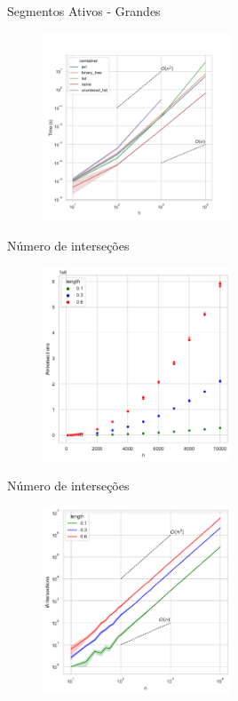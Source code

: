 \documentclass[aspectratio=169,usenames,dvipsnames]{beamer}
\begin{document}
\begin{frame}{Segmentos Ativos - Grandes}
      \begin{figure}
        \includegraphics[width=0.5\textwidth]{figs/tempos/plot_random_big_time.pdf}
      \end{figure}
\end{frame}

\begin{frame}{Número de interseções}
  \begin{figure}
    \includegraphics[width=0.5\textwidth]{figs/exemplos/n_intersections.pdf}
  \end{figure}
\end{frame}

\begin{frame}{Número de interseções}
  \begin{figure}
    \includegraphics[width=0.5\textwidth]{figs/exemplos/n_intersections_log.pdf}
  \end{figure}
\end{frame}
\end{document}
